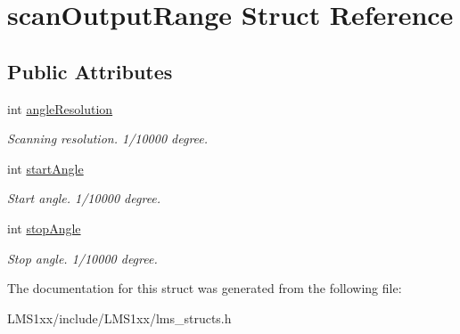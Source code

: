 \hypertarget{structscanOutputRange}{}\section{scan\+Output\+Range Struct Reference}
\label{structscanOutputRange}
\subsection*{Public Attributes}
\begin{DoxyCompactItemize}
\item 
\mbox{\label{structscanOutputRange_a0bc6054023071d6bbf05a8c4d02b2030}} 
int \hyperlink{structscanOutputRange_a0bc6054023071d6bbf05a8c4d02b2030}{angle\+Resolution}
\begin{DoxyCompactList}\small\item\em Scanning resolution. 1/10000 degree. \end{DoxyCompactList}\item 
\mbox{\label{structscanOutputRange_ae2e59ff9000ed024f164b458b06f13bd}} 
int \hyperlink{structscanOutputRange_ae2e59ff9000ed024f164b458b06f13bd}{start\+Angle}
\begin{DoxyCompactList}\small\item\em Start angle. 1/10000 degree. \end{DoxyCompactList}\item 
\mbox{\label{structscanOutputRange_a4355ca928fde704138640cf63dd45c1a}} 
int \hyperlink{structscanOutputRange_a4355ca928fde704138640cf63dd45c1a}{stop\+Angle}
\begin{DoxyCompactList}\small\item\em Stop angle. 1/10000 degree. \end{DoxyCompactList}\end{DoxyCompactItemize}


The documentation for this struct was generated from the following file\+:\begin{DoxyCompactItemize}
\item 
L\+M\+S1xx/include/\+L\+M\+S1xx/lms\+\_\+structs.\+h\end{DoxyCompactItemize}
